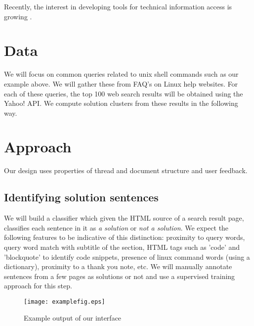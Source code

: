 \documentclass[11pt]{article}
\begin{document}
Recently, the interest in developing tools for technical information access
is growing \cite{baldwin-EtAl:2010:SOCIAL,kim2010towards}.


\section{Data}
We will focus on common queries related to unix shell commands such as our example
above. We will gather these from FAQ's on Linux help websites. For each of these
queries, the top 100 web search results will be obtained using the Yahoo! API.
We compute solution 
clusters from these results in the following way.
 
\section{Approach}
Our design uses properties of thread and document structure and user feedback.  

\subsection{Identifying solution sentences} We will build a classifier which 
given the HTML source of a search result page, classifies
each sentence in it as \emph{a solution} or \emph{not a solution}. We expect the following
features to be indicative of this distinction: proximity to query words, 
query word match with
subtitle of the section, HTML tags such as 'code' and 'blockquote' to identify code
snippets, presence of linux command words (using a dictionary), 
proximity to a thank you note, etc. 
We will manually annotate sentences from a few pages 
as solutions or not and use a supervised training approach for this step.

\begin{figure}
\centering
\texttt{[image: examplefig.eps]}
\caption{Example output of our interface}
\label{fig:example}
\end{figure}
\end{document}
